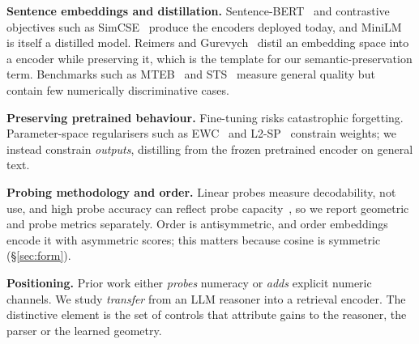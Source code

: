 \documentclass[conference]{IEEEtran}
\begin{document}
\textbf{Sentence embeddings and distillation.} Sentence-BERT~\cite{reimers2019sbert} and contrastive objectives such
as SimCSE~\cite{gao2021simcse} produce the encoders deployed today, and MiniLM~\cite{wang2020minilm} is itself a
distilled model. Reimers and Gurevych~\cite{reimers2020multilingual} distil an embedding space into a encoder while
preserving it, which is the template for our semantic-preservation term. Benchmarks such as
MTEB~\cite{muennighoff2023mteb} and STS~\cite{cer2017sts} measure general quality but contain few numerically
discriminative cases.

\textbf{Preserving pretrained behaviour.} Fine-tuning risks catastrophic forgetting. Parameter-space regularisers such
as EWC~\cite{kirkpatrick2017ewc} and L2-SP~\cite{li2018l2sp} constrain weights; we instead constrain \emph{outputs},
distilling from the frozen pretrained encoder on general text.

\textbf{Probing methodology and order.} Linear probes measure decodability, not use, and high probe accuracy can
reflect probe capacity~\cite{hewitt2019control}, so we report geometric and probe metrics separately. Order is
antisymmetric, and order embeddings~\cite{vendrov2016order} encode it with asymmetric scores; this matters because
cosine is symmetric (\S\ref{sec:form}).

\textbf{Positioning.} Prior work either \emph{probes} numeracy or \emph{adds} explicit numeric channels. We study
\emph{transfer} from an LLM reasoner into a retrieval encoder. The distinctive element is the set of controls that
attribute gains to the reasoner, the parser or the learned geometry.

\end{document}
